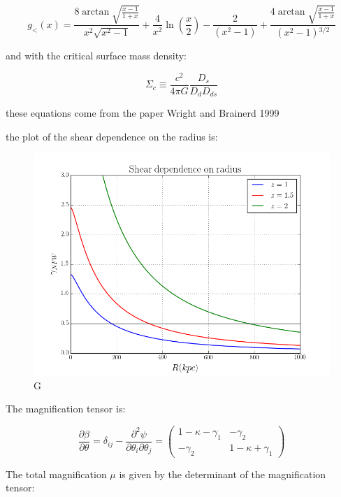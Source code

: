 \begin{equation}
g_{<}(x)=\frac{8 \arctan \sqrt{\frac{x-1}{1+x}}}{x^{2}\sqrt{x^{2}-1}}+\frac{4}{x^{2}}\ln \left(\frac{x}{2}\right)-\frac{2}{\left(x^{2}-1\right)}+\frac{4 \arctan \sqrt{\frac{x-1}{1+x}}}{\left(x^{2}-1\right){}^{3/2}}
\end{equation} 

and with the critical surface mass density:

\begin{equation}
\Sigma_{c}\equiv\frac{c^{2}}{4\pi G}\frac{D_{s}}{D_{d}D_{ds}}
\end{equation}

these equations come from the paper Wright and Brainerd 1999

the plot of the shear dependence on the radius is:

\begin{figure}[H]
\centering
\includegraphics[width=12cm]{images/Shear dependence on radius.png}
\caption[M]{G}
\end{figure}

The magnification tensor is:

\begin{equation}
\frac{\partial\beta}{\partial\theta}=\delta_{ij}-\frac{\partial^{2}\psi}{\partial\theta_{i}\partial\theta_{j}}=\left(\begin{array}{cc}
1-\kappa-\gamma_{1} & -\gamma_{2}\\
-\gamma_{2} & 1-\kappa+\gamma_{1}
\end{array}\right)
\end{equation}

The total magnification $\mu$ is given by the determinant of the magnification tensor:

